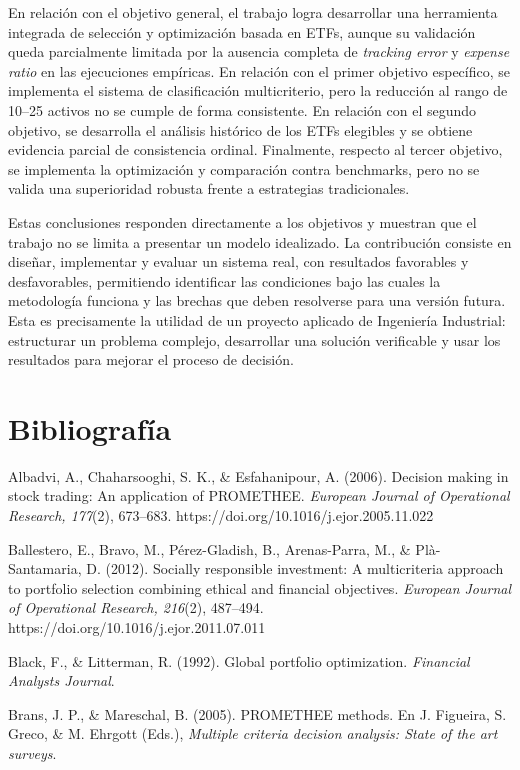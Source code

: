 \documentclass[12pt,letterpaper]{article}
\newcommand{\apa}[1]{\begingroup\sloppy\hangindent=1.25cm\hangafter=1 #1\par\vspace{0.35em}\endgroup}
\begin{document}
En relación con el objetivo general, el trabajo logra desarrollar una herramienta integrada de selección y optimización basada en ETFs, aunque su validación queda parcialmente limitada por la ausencia completa de \textit{tracking error} y \textit{expense ratio} en las ejecuciones empíricas. En relación con el primer objetivo específico, se implementa el sistema de clasificación multicriterio, pero la reducción al rango de 10--25 activos no se cumple de forma consistente. En relación con el segundo objetivo, se desarrolla el análisis histórico de los ETFs elegibles y se obtiene evidencia parcial de consistencia ordinal. Finalmente, respecto al tercer objetivo, se implementa la optimización y comparación contra benchmarks, pero no se valida una superioridad robusta frente a estrategias tradicionales.

Estas conclusiones responden directamente a los objetivos y muestran que el trabajo no se limita a presentar un modelo idealizado. La contribución consiste en diseñar, implementar y evaluar un sistema real, con resultados favorables y desfavorables, permitiendo identificar las condiciones bajo las cuales la metodología funciona y las brechas que deben resolverse para una versión futura. Esta es precisamente la utilidad de un proyecto aplicado de Ingeniería Industrial: estructurar un problema complejo, desarrollar una solución verificable y usar los resultados para mejorar el proceso de decisión.


\clearpage
\section{Bibliografía}
\label{sec:bibliografia}

\apa{Albadvi, A., Chaharsooghi, S. K., \& Esfahanipour, A. (2006). Decision making in stock trading: An application of PROMETHEE. \textit{European Journal of Operational Research, 177}(2), 673--683. https://doi.org/10.1016/j.ejor.2005.11.022}

\apa{Ballestero, E., Bravo, M., Pérez-Gladish, B., Arenas-Parra, M., \& Plà-Santamaria, D. (2012). Socially responsible investment: A multicriteria approach to portfolio selection combining ethical and financial objectives. \textit{European Journal of Operational Research, 216}(2), 487--494. https://doi.org/10.1016/j.ejor.2011.07.011}

\apa{Black, F., \& Litterman, R. (1992). Global portfolio optimization. \textit{Financial Analysts Journal}.}

\apa{Brans, J. P., \& Mareschal, B. (2005). PROMETHEE methods. En J. Figueira, S. Greco, \& M. Ehrgott (Eds.), \textit{Multiple criteria decision analysis: State of the art surveys}.}
\end{document}
